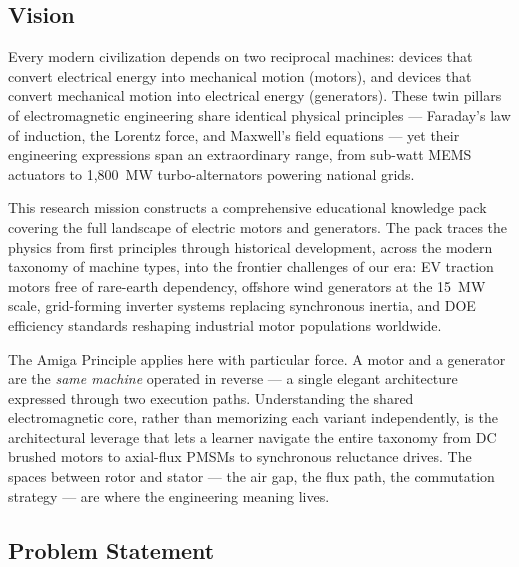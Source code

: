 \documentclass[11pt,letterpaper]{article}
\begin{document}
\subsection{Vision}

Every modern civilization depends on two reciprocal machines: devices that convert electrical energy into mechanical motion (motors), and devices that convert mechanical motion into electrical energy (generators). These twin pillars of electromagnetic engineering share identical physical principles --- Faraday's law of induction, the Lorentz force, and Maxwell's field equations --- yet their engineering expressions span an extraordinary range, from sub-watt MEMS actuators to 1,800~MW turbo-alternators powering national grids.

This research mission constructs a comprehensive educational knowledge pack covering the full landscape of electric motors and generators. The pack traces the physics from first principles through historical development, across the modern taxonomy of machine types, into the frontier challenges of our era: EV traction motors free of rare-earth dependency, offshore wind generators at the 15~MW scale, grid-forming inverter systems replacing synchronous inertia, and DOE efficiency standards reshaping industrial motor populations worldwide.

The Amiga Principle applies here with particular force. A motor and a generator are the \emph{same machine} operated in reverse --- a single elegant architecture expressed through two execution paths. Understanding the shared electromagnetic core, rather than memorizing each variant independently, is the architectural leverage that lets a learner navigate the entire taxonomy from DC brushed motors to axial-flux PMSMs to synchronous reluctance drives. The spaces between rotor and stator --- the air gap, the flux path, the commutation strategy --- are where the engineering meaning lives.

\subsection{Problem Statement}
\end{document}
